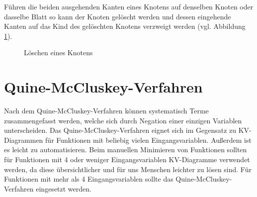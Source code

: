Führen die beiden ausgehenden Kanten eines Knotens auf denselben Knoten oder dasselbe Blatt so kann der Knoten gelöscht werden und dessen eingehende Kanten auf das Kind des gelöschten Knotens verzweigt werden (vgl. Abbildung \ref{knotenLoeschn}). 
\begin{figure}[htp]
\centering
{}
\caption{Löschen eines Knotens}
\label{knotenLoeschn}
\end{figure}

\section{Quine-McCluskey-Verfahren}
Nach dem Quine-McCluskey-Verfahren können systematisch Terme zusammengefasst werden, welche sich durch Negation einer einzigen Variablen unterscheiden. Das Quine-McCluskey-Verfahren eignet sich im Gegensatz zu KV-Diagrammen für Funktionen mit beliebig vielen Eingangsvariablen. Außerdem ist es leicht zu automatisieren. Beim manuellen Minimieren von Funktionen sollten für Funktionen mit 4 oder weniger Eingangsvariablen KV-Diagramme verwendet werden, da diese übersichtlicher und für uns Menschen leichter zu lösen sind. Für Funktionen mit mehr als 4 Eingangsvariablen sollte das Quine-McCluskey-Verfahren eingesetzt werden.


